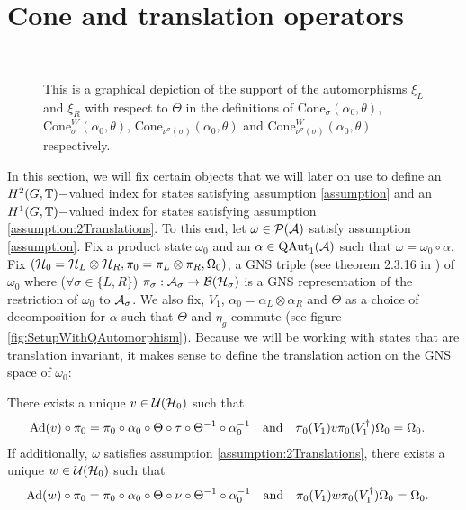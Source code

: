 \documentclass[11pt,a4paper,twoside]{article}
\numberwithin{equation}{section}
\begin{document}
	\section{Cone and translation operators}\label{sec:ConeAndTranslationOperators}
	\begin{figure}
		\centering
		\def\s{0.4}
		\resizebox{0.21\textwidth}{!}{%
			}
		$\quad$
		\def\s{0.4}
		\resizebox{0.21\textwidth}{!}{%
			}
		$\quad$
		\def\s{0.4}
		\resizebox{0.21\textwidth}{!}{%
			}
		$\quad$
		\def\s{0.4}
		\resizebox{0.24\textwidth}{!}{%
			}
		\caption{This is a graphical depiction of the support of the automorphisms $\xi_L$ and $\xi_R$ with respect to $\Theta$ in the definitions of $\textrm{Cone}_{\sigma}(\alpha_0,\theta)$, $\textrm{Cone}_{\sigma}^W(\alpha_0,\theta)$, $\textrm{Cone}_{\nu^\sigma(\sigma)}(\alpha_0,\theta)$ and $\textrm{Cone}_{\nu^\sigma(\sigma)}^W(\alpha_0,\theta)$ respectively.}
		\label{fig:ConeOperators}
	\end{figure}
	In this section, we will fix certain objects that we will later on use to define an $H^2(G,\TT)-$valued index for states satisfying assumption \ref{assumption} and an $H^1(G,\TT)-$valued index for states satisfying assumption \ref{assumption:2Translations}. To this end, let $\omega\in\PP(\AA)$ satisfy assumption \ref{assumption}. Fix a product state $\omega_0$ and an $\alpha\in\QAut{\AA}$ such that $\omega=\omega_0\circ\alpha$. Fix $(\HH_0=\HH_L\otimes\HH_R,\pi_0=\pi_L\otimes\pi_R,\Omega_0)$, a GNS triple (see theorem 2.3.16 in \cite{bratteli1979operator}) of $\omega_0$ where ($\forall\sigma\in\{L,R\}$) $\pi_\sigma:\AA_\sigma\rightarrow\BB(\HH_\sigma)$ is a GNS representation of the restriction of $\omega_0$ to $\AA_\sigma$. We also fix, $V_1$, $\alpha_0=\alpha_L\otimes\alpha_R$ and $\Theta$ as a choice of decomposition for $\alpha$ such that $\Theta$ and $\eta_g$ commute (see figure \ref{fig:SetupWithQAutomorphism}). Because we will be working with states that are translation invariant, it makes sense to define the translation action on the GNS space of $\omega_0$:
	\begin{lemma}\label{lem:Definition_v_And_w}
		There exists a unique $v\in\UU(\HH_0)$ such that
		\begin{align}
			\Ad{v}\circ\pi_0&=\pi_0\circ\alpha_0\circ\Theta\circ\tau\circ\Theta^{-1}\circ\alpha_0^{-1}&&\text{and}&\pi_0(V_1)v\pi_0(V_1^\dagger)\Omega_0&=\Omega_0.
		\end{align}
		If additionally, $\omega$ satisfies assumption \ref{assumption:2Translations}, there exists a unique $w\in\UU(\HH_0)$ such that
		\begin{align}
			\Ad{w}\circ\pi_0&=\pi_0\circ\alpha_0\circ\Theta\circ\nu\circ\Theta^{-1}\circ\alpha_0^{-1}&&\text{and}&\pi_0(V_1)w\pi_0(V_1^\dagger)\Omega_0&=\Omega_0.
		\end{align}
	\end{lemma}
\end{document}
